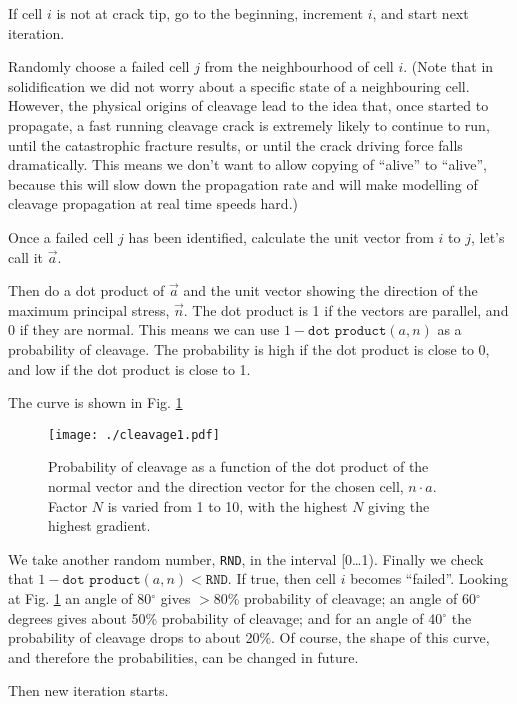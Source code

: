 If cell $i$ is not at crack tip, go to the beginning, increment
$i$, and start next iteration.

Randomly choose a failed cell $j$ from the neighbourhood of cell $i$.
(Note that in solidification we did not worry about a specific
state of a neighbouring cell. However, the physical origins of
cleavage lead to the idea that, once started to propagate, a fast running
cleavage crack is extremely likely to continue to run, until
the catastrophic fracture results, or until the crack driving
force falls dramatically. This means we don't want to allow
copying of ``alive'' to ``alive'', because this will slow
down the propagation rate and will make modelling of cleavage
propagation at real time speeds hard.)

Once a failed cell $j$ has been identified, calculate
the unit vector from $i$ to $j$, let's call it $\vec{a}$.

Then do a dot product of $\vec{a}$ and the unit vector
showing the direction of the maximum principal stress,
$\vec{n}$. The dot product is 1 if the vectors are parallel,
and 0 if they are normal. This means we can use
$1-\texttt{dot product}(a,n)$ as a probability of cleavage.
The probability is high if the dot product is close
to 0, and low if the dot product is close to 1.

The curve is shown in Fig. \ref{fig:cl:prob}

\begin{figure}[htb]
\centering
\texttt{[image: ./cleavage1.pdf]}
\caption{Probability of cleavage as a function of the
dot product of the normal vector and the direction vector for
the chosen cell, $n\cdot a$. Factor $N$ is varied from
1 to 10, with the highest $N$ giving the highest gradient.}
\label{fig:cl:prob}
\end{figure}

We take another random number, \texttt{RND}, in the interval [0\ldots 1).
Finally we check that  $1-\texttt{dot product}(a,n) < \texttt{RND}$.
If true, then cell $i$ becomes ``failed''.
Looking at Fig. \ref{fig:cl:prob} an angle of 80$^\circ$
gives $>80$\% probability of cleavage; an angle of 60$^\circ$
degrees gives about 50\% probability of cleavage; and for
an angle of 40$^\circ$ the probability of cleavage
drops to about 20\%. Of course, the shape of this curve,
and therefore the probabilities, can be changed in future.

Then new iteration starts.
